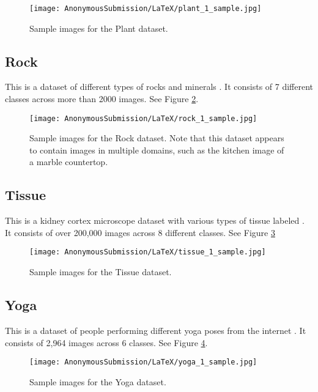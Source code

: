\documentclass[letterpaper]{article} %
\theoremstyle{plain}
\theoremstyle{definition}
\theoremstyle{remark}
\begin{document}
\begin{figure}[htbp]
    \centering
    \texttt{[image: AnonymousSubmission/LaTeX/plant\_1\_sample.jpg]}
    \caption{Sample images for the Plant dataset.}
    \label{fig:plant}
\end{figure}

\subsection{Rock} This is a dataset of different types of rocks and minerals \citep{rock_data}. It consists of 7 different classes across more than 2000 images. See Figure \ref{fig:rock}.

\begin{figure}[htbp]
    \centering
    \texttt{[image: AnonymousSubmission/LaTeX/rock\_1\_sample.jpg]}
    \caption{Sample images for the Rock dataset. Note that this dataset appears to contain images in multiple domains, such as the kitchen image of a marble countertop.}
    \label{fig:rock}
\end{figure}



\subsection{Tissue} This is a kidney cortex microscope dataset with various types of tissue labeled \citep{yang2023medmnist}. It consists of over 200,000 images across 8 different classes. See Figure \ref{fig:tissue}

\begin{figure}[htbp]
    \centering
    \texttt{[image: AnonymousSubmission/LaTeX/tissue\_1\_sample.jpg]}
    \caption{Sample images for the Tissue dataset.}
    \label{fig:tissue}
\end{figure}



\subsection{Yoga} This is a dataset of people performing different yoga poses from the internet \citep{yoga_data}. It consists of 2,964 images across 6 classes. See Figure \ref{fig:yoga}.

\begin{figure}[htbp]
    \centering
    \texttt{[image: AnonymousSubmission/LaTeX/yoga\_1\_sample.jpg]}
    \caption{Sample images for the Yoga dataset.}
    \label{fig:yoga}
\end{figure}
\end{document}

